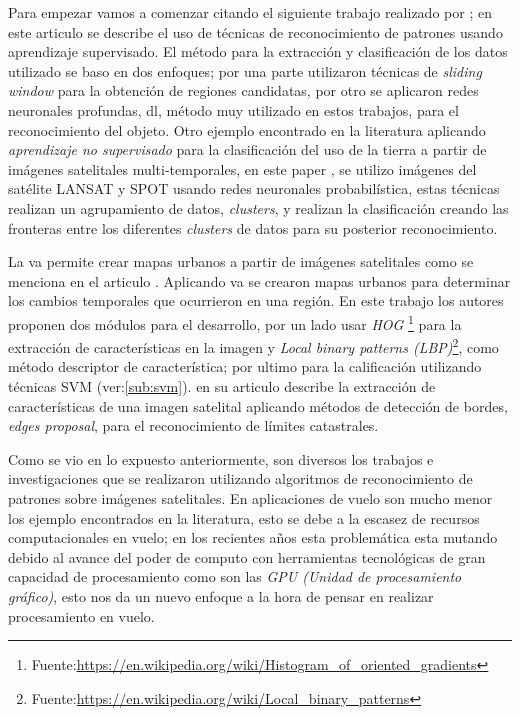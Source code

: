 



Para empezar vamos a comenzar citando el siguiente trabajo realizado por \citep{Cheang}; en este articulo se describe el uso de técnicas de reconocimiento de patrones usando aprendizaje supervisado. El método para la extracción y clasificación de los datos utilizado se baso en dos enfoques; por una parte utilizaron técnicas de \textit{sliding window} para la obtención de regiones candidatas, por otro se aplicaron redes neuronales profundas, \ac{dl}, método muy utilizado en estos trabajos, para el reconocimiento del objeto. Otro ejemplo encontrado en la literatura aplicando  \textit{aprendizaje no supervisado} para la clasificación del uso de la tierra a partir de imágenes satelitales multi-temporales, en este paper \citep{pnn}, se utilizo imágenes del satélite LANSAT y SPOT usando redes neuronales probabilística, estas técnicas realizan un agrupamiento de datos, \textit{clusters}, y realizan la clasificación creando las fronteras entre los diferentes \textit{clusters} de datos para su posterior reconocimiento.

La \ac{va} permite crear mapas urbanos a partir de imágenes satelitales como se menciona en el articulo \citep{detectionHOG}. Aplicando \ac{va} se crearon mapas urbanos para determinar los cambios temporales que ocurrieron en una región. En este trabajo los autores proponen dos módulos para el desarrollo, por un lado usar \textit{HOG} \footnote{Fuente:\url{https://en.wikipedia.org/wiki/Histogram_of_oriented_gradients}} para la extracción de características en la imagen y \textit{Local binary patterns (LBP)}\footnote{Fuente:\url{https://en.wikipedia.org/wiki/Local_binary_patterns}}, como método descriptor de característica; por ultimo para la calificación utilizando técnicas SVM (ver:\ref{sub:svm}). \cite{usman} en su articulo describe la extracción de características de una imagen satelital aplicando métodos de  detección de bordes, \textit{edges proposal}, para el 
reconocimiento de límites catastrales.

Como se vio en lo expuesto anteriormente, son diversos los trabajos e investigaciones que se realizaron utilizando algoritmos de reconocimiento de patrones sobre imágenes satelitales. En aplicaciones de vuelo son mucho menor los ejemplo encontrados en la literatura, esto se debe a la escasez de recursos computacionales en vuelo; en los recientes años esta problemática esta mutando debido al avance del poder de computo con herramientas tecnológicas de gran capacidad de procesamiento como son las \textit{GPU (Unidad de procesamiento gráfico)}, esto nos da un nuevo enfoque a la hora de pensar en realizar procesamiento en vuelo.

